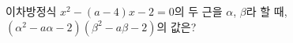 이차방정식 $x^2-(a-4)x-2=0$의 두 근을 $\alpha$, $\beta$라 할 때, $(\alpha^2-a\alpha-2)(\beta^2-a\beta-2)$의 값은? 
